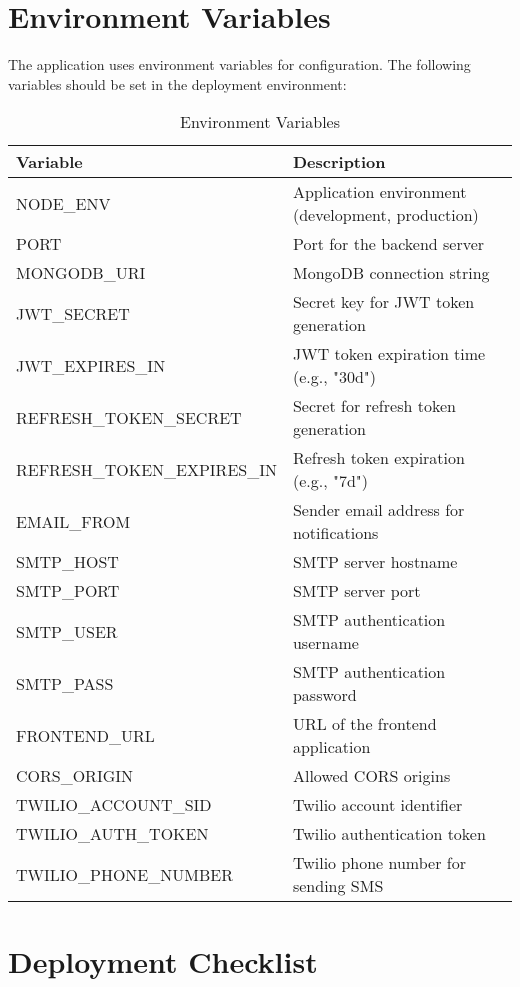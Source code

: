 \documentclass[12pt,a4paper]{article}
\begin{document}
\section{Environment Variables}\label{appendix:env}
The application uses environment variables for configuration. The following variables should be set in the deployment environment:

\begin{table}[H]
\centering
\begin{tabular}{|p{5cm}|p{9cm}|}
\hline
\textbf{Variable} & \textbf{Description} \\
\hline
NODE\_ENV & Application environment (development, production) \\
\hline
PORT & Port for the backend server \\
\hline
MONGODB\_URI & MongoDB connection string \\
\hline
JWT\_SECRET & Secret key for JWT token generation \\
\hline
JWT\_EXPIRES\_IN & JWT token expiration time (e.g., "30d") \\
\hline
REFRESH\_TOKEN\_SECRET & Secret for refresh token generation \\
\hline
REFRESH\_TOKEN\_EXPIRES\_IN & Refresh token expiration (e.g., "7d") \\
\hline
EMAIL\_FROM & Sender email address for notifications \\
\hline
SMTP\_HOST & SMTP server hostname \\
\hline
SMTP\_PORT & SMTP server port \\
\hline
SMTP\_USER & SMTP authentication username \\
\hline
SMTP\_PASS & SMTP authentication password \\
\hline
FRONTEND\_URL & URL of the frontend application \\
\hline
CORS\_ORIGIN & Allowed CORS origins \\
\hline
TWILIO\_ACCOUNT\_SID & Twilio account identifier \\
\hline
TWILIO\_AUTH\_TOKEN & Twilio authentication token \\
\hline
TWILIO\_PHONE\_NUMBER & Twilio phone number for sending SMS \\
\hline
\end{tabular}
\caption{Environment Variables}
\end{table}

\section{Deployment Checklist}\label{appendix:deployment}
\end{document}
